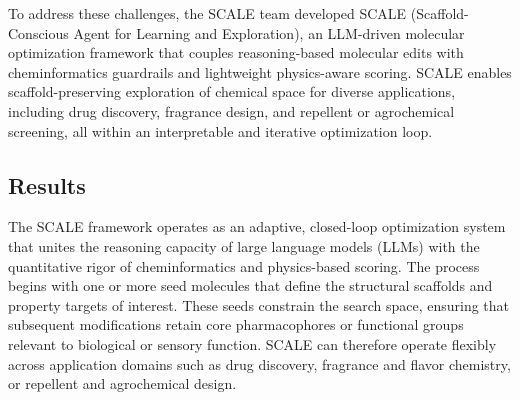 To address these challenges, the SCALE team developed SCALE (Scaffold-Conscious Agent for Learning and Exploration), an LLM-driven molecular optimization framework that couples reasoning-based molecular edits with cheminformatics guardrails and lightweight physics-aware scoring. SCALE enables scaffold-preserving exploration of chemical space for diverse applications, including drug discovery, fragrance design, and repellent or agrochemical screening, all within an interpretable and iterative optimization loop.

%

\subsection*{Results}
The SCALE framework operates as an adaptive, closed-loop optimization system that unites the reasoning capacity of large language models (LLMs) with the quantitative rigor of cheminformatics and physics-based scoring. The process begins with one or more seed molecules that define the structural scaffolds and property targets of interest. These seeds constrain the search space, ensuring that subsequent modifications retain core pharmacophores or functional groups relevant to biological or sensory function. SCALE can therefore operate flexibly across application domains such as drug discovery, fragrance and flavor chemistry, or repellent and agrochemical design.

